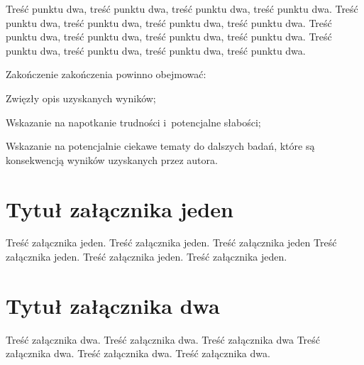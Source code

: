 \documentclass[brudnopis,xodstep]{wkmgr}
\begin{document}
Treść punktu dwa, treść punktu dwa, treść punktu dwa, treść punktu dwa.
Treść punktu dwa, treść punktu dwa, treść punktu dwa, treść punktu dwa.
Treść punktu dwa, treść punktu dwa, treść punktu dwa, treść punktu dwa.
Treść punktu dwa, treść punktu dwa, treść punktu dwa, treść punktu dwa.

\summary

Zakończenie zakończenia powinno obejmować:

Zwięzły opis uzyskanych wyników;

Wskazanie na napotkanie trudności i~potencjalne słabości;

Wskazanie na  potencjalnie ciekawe tematy do dalszych badań, które są konsekwencją
wyników uzyskanych przez autora. 

%
\appendix
\chapter{Tytuł załącznika jeden}

Treść załącznika jeden. Treść załącznika jeden. Treść załącznika jeden
Treść załącznika jeden. Treść załącznika jeden.  Treść załącznika
jeden.

\chapter{Tytuł załącznika dwa}

Treść załącznika dwa. Treść załącznika dwa. Treść załącznika dwa Treść
załącznika dwa. Treść załącznika dwa.  Treść załącznika dwa.
\end{document}
